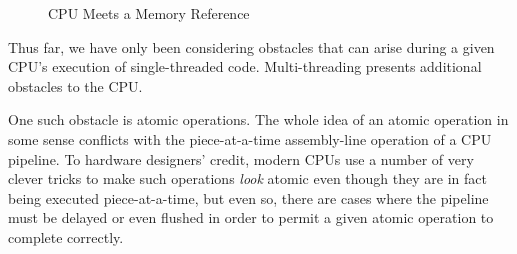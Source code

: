 \begin{figure}[htb]
\begin{center}
\end{center}
\caption{CPU Meets a Memory Reference}
\label{fig:intro:CPU Meets a Memory Reference}
\end{figure}

Thus far, we have only been considering obstacles that can arise during
a given CPU's execution of single-threaded code.
Multi-threading presents additional obstacles to the CPU.

One such obstacle is atomic operations.
The whole idea of an atomic operation in some sense conflicts with
the piece-at-a-time assembly-line operation of a CPU pipeline.
To hardware designers' credit, modern CPUs use a number of very clever
tricks to make such operations \emph{look} atomic even though they
are in fact being executed piece-at-a-time, but even so, there are
cases where the pipeline must be delayed or even flushed in order to
permit a given atomic operation to complete correctly.

